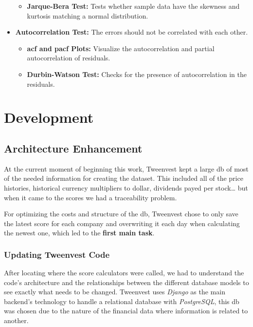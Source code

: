 \documentclass[11pt,english,a4paper,hidelinks]{book}
\begin{document}
\begin{itemize}
\begin{itemize}
            \item \textbf{Jarque-Bera Test:} Tests whether sample data have the skewness and kurtosis matching a normal distribution.
        \end{itemize}
    \item \textbf{Autocorrelation Test:} The errors should not be correlated with each other.
        \begin{itemize}
            \item \textbf{\gls{acf} and \gls{pacf} Plots:} Visualize the autocorrelation and partial autocorrelation of residuals.
            \item \textbf{Durbin-Watson Test:} Checks for the presence of autocorrelation in the residuals.
        \end{itemize}
\end{itemize}

\chapter{Development}

\section{Architecture Enhancement}

\noindent At the current moment of beginning this work, Tweenvest kept a large \acrshort{db} of most of the needed information for creating the dataset. This included all of the price histories, historical currency multipliers to dollar, dividends payed per stock… but when it came to the scores we had a traceability problem.

\vspace{0.5cm}
\noindent For optimizing the costs and structure of the \acrshort{db}, Tweenvest chose to only save the latest score for each company and overwriting it each day when calculating the newest one, which led to the \textbf{first main task}.

\subsection{Updating Tweenvest Code}

After locating where the score calculators were called, we had to understand the code's architecture and the relationships between the different database models to see exactly what needs to be changed. Tweenvest uses \textit{Django} as the main backend's technology to handle a relational database with \textit{PostgreSQL}, this \acrshort{db} was chosen due to the nature of the financial data where information is related to another.
\end{document}
